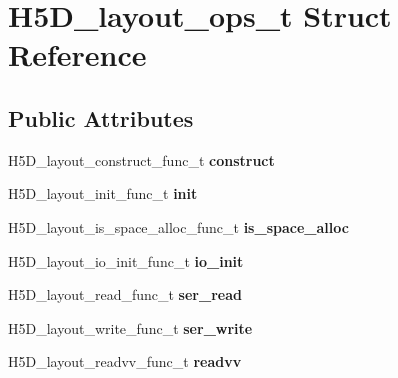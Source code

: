 \hypertarget{struct_h5_d__layout__ops__t}{}\section{H5\+D\+\_\+layout\+\_\+ops\+\_\+t Struct Reference}
\label{struct_h5_d__layout__ops__t}
\subsection*{Public Attributes}
\begin{DoxyCompactItemize}
\item 
\mbox{\label{struct_h5_d__layout__ops__t_a76b95d40332c970b2d71aaa6ba72b875}} 
H5\+D\+\_\+layout\+\_\+construct\+\_\+func\+\_\+t {\bfseries construct}
\item 
\mbox{\label{struct_h5_d__layout__ops__t_a437a125d338574a7393c68be40d8a243}} 
H5\+D\+\_\+layout\+\_\+init\+\_\+func\+\_\+t {\bfseries init}
\item 
\mbox{\label{struct_h5_d__layout__ops__t_a829bf3fb32578108eac8643f1f47943f}} 
H5\+D\+\_\+layout\+\_\+is\+\_\+space\+\_\+alloc\+\_\+func\+\_\+t {\bfseries is\+\_\+space\+\_\+alloc}
\item 
\mbox{\label{struct_h5_d__layout__ops__t_a64a74a10bc262b79cf84511e43fe104e}} 
H5\+D\+\_\+layout\+\_\+io\+\_\+init\+\_\+func\+\_\+t {\bfseries io\+\_\+init}
\item 
\mbox{\label{struct_h5_d__layout__ops__t_afd7b5b399bdda7f527352e6712327193}} 
H5\+D\+\_\+layout\+\_\+read\+\_\+func\+\_\+t {\bfseries ser\+\_\+read}
\item 
\mbox{\label{struct_h5_d__layout__ops__t_ad8c10607756a2f3cec42232e6ae7e781}} 
H5\+D\+\_\+layout\+\_\+write\+\_\+func\+\_\+t {\bfseries ser\+\_\+write}
\item 
\mbox{\label{struct_h5_d__layout__ops__t_a93e5c4880d53a05a1cc8303c94fa4ab4}} 
H5\+D\+\_\+layout\+\_\+readvv\+\_\+func\+\_\+t {\bfseries readvv}
\item 

\end{DoxyCompactItemize}
